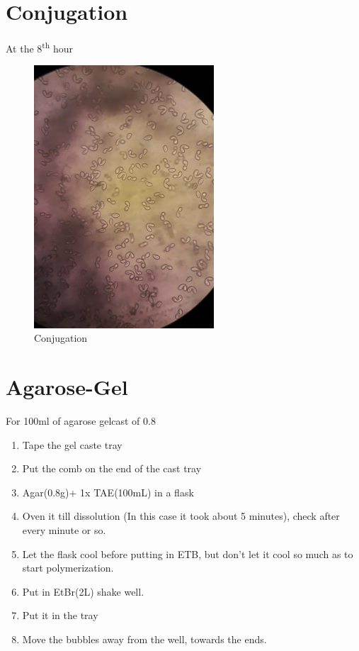 \documentclass[11pt,twoside,a4paper]{article}
\begin{document}
\section{Conjugation}
At the 8\textsuperscript{th} hour
\begin{figure}[H]
	\centering
	\includegraphics[width=0.6\textwidth]{images/conjugation1.jpeg}
	\caption{Conjugation}
	\label{conjugation1}
\end{figure}

\section{Agarose-Gel}
For 100ml of agarose gelcast of 0.8%
\begin{enumerate}
	\item Tape the gel caste tray
	\item Put the comb on the end of the cast tray
	\item Agar(0.8g)+ 1x TAE(100mL) in a flask
	\item Oven it till dissolution (In this case it took about 5 minutes), check after every minute or so.
	\item Let the flask cool before putting in ETB, but don't let it cool so much as to start polymerization.
	\item Put in EtBr(2\textmu{}L) shake well.
	\item Put it in the tray
	\item Move the bubbles away from the well, towards the ends.
\end{enumerate}
\end{document}

